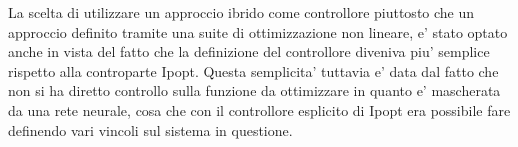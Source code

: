 La scelta di utilizzare un approccio ibrido come controllore piuttosto che un approccio definito tramite una suite
di ottimizzazione non lineare, e' stato optato anche in vista del fatto che la definizione del controllore diveniva 
piu' semplice rispetto alla controparte Ipopt. Questa semplicita' tuttavia e' data dal fatto che non si ha diretto 
controllo sulla funzione da ottimizzare in quanto e' mascherata da una rete neurale, cosa che con il controllore 
esplicito di Ipopt era possibile fare definendo vari vincoli sul sistema in questione.
